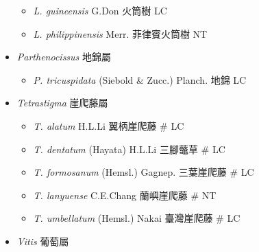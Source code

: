 \begin{itemize}
  \begin{itemize}
        \item[] \textit{L. guineensis} G.Don  火筒樹   LC
        \item[] \textit{L. philippinensis} Merr.  菲律賓火筒樹   NT
  \end{itemize}
 \item[] \textit{Parthenocissus} 地錦屬
                                
  \begin{itemize}
        \item[] \textit{P. tricuspidata} (Siebold \& Zucc.) Planch.  地錦   LC
  \end{itemize}
 \item[] \textit{Tetrastigma} 崖爬藤屬
                                
  \begin{itemize}
        \item[] \textit{T. alatum} H.L.Li  翼柄崖爬藤  \# LC
        \item[] \textit{T. dentatum} (Hayata) H.L.Li  三腳虌草  \# LC
        \item[] \textit{T. formosanum} (Hemsl.) Gagnep.  三葉崖爬藤  \# LC
        \item[] \textit{T. lanyuense} C.E.Chang  蘭嶼崖爬藤  \# NT
        \item[] \textit{T. umbellatum} (Hemsl.) Nakai  臺灣崖爬藤  \# LC
  \end{itemize}
 \item[] \textit{Vitis} 葡萄屬
                                

\end{itemize}
